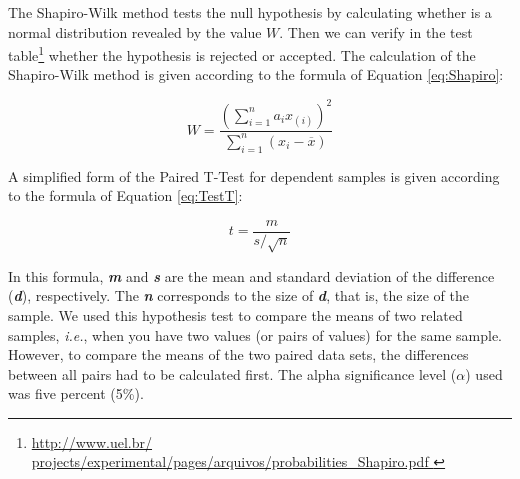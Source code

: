 The Shapiro-Wilk method tests the null hypothesis by calculating whether is a normal distribution revealed by the value $W$.
Then we can verify in the test table\footnote{\url{ http://www.uel.br/ projects/experimental/pages/arquivos/probabilities\_Shapiro.pdf }} whether the hypothesis is rejected or accepted.
The calculation of the Shapiro-Wilk method is given according to the formula of Equation \ref{eq:Shapiro}:

\begin{equation}
\label{eq:Shapiro}
W = \frac{\left(\sum_{i=1}^{n} a_ix_{(i)}\right)^2}{\sum_{i=1}^{n}\left(x_i -\overline{x}\right)} 
\end{equation}

A simplified form of the Paired T-Test for dependent samples
is given according to the formula of Equation \ref{eq:TestT}:

\begin{equation}
\label{eq:TestT}
t = \frac{m}{s/\sqrt{n}} 
\end{equation}

In this formula, \textit{\textbf{m}} and \textit{\textbf{s}} are the mean and standard deviation of the difference (\textbf{\textit{d}}), respectively.
The \textit{\textbf{n}} corresponds to the size of \textit{\textbf{d}}, that is, the size of the sample.
We used this hypothesis test to compare the means of two related samples, \textit{i.e.}, when you have two values (or pairs of values) for the same sample.
However, to compare the means of the two paired data sets, the differences between all pairs had to be calculated first.
The alpha significance level ($\alpha$) used was five percent (5\%).

